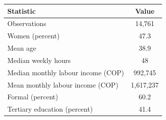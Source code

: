 \begin{tabular}{lc}
\toprule
Statistic & Value \\
\midrule
Observations & 14,761 \\
Women (percent) & 47.3 \\
Mean age & 38.9 \\
Median weekly hours & 48 \\
Median monthly labour income (COP) & 992,745 \\
Mean monthly labour income (COP) & 1,617,237 \\
Formal (percent) & 60.2 \\
Tertiary education (percent) & 41.4 \\
\bottomrule
\end{tabular}
